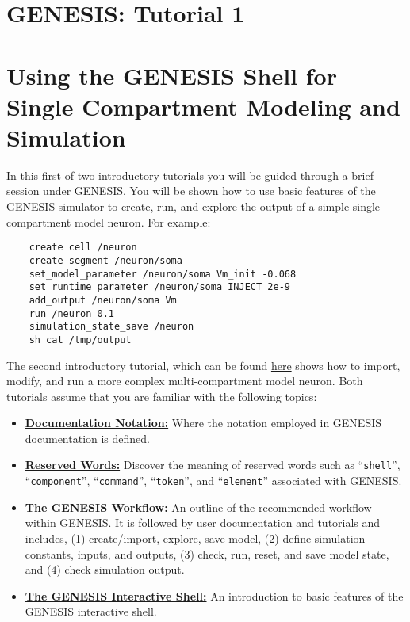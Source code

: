 \documentclass[12pt]{article}
\begin{document}
\section*{GENESIS: Tutorial 1}

\section*{Using the GENESIS Shell for\\Single Compartment Modeling and Simulation}

In this first of two introductory tutorials you will be guided through a brief session under GENESIS. You will be shown how to use basic features of the GENESIS simulator to create, run, and explore the output of a simple single compartment model neuron. For example:

\begin{verbatim}
    create cell /neuron
    create segment /neuron/soma
    set_model_parameter /neuron/soma Vm_init -0.068
    set_runtime_parameter /neuron/soma INJECT 2e-9
    add_output /neuron/soma Vm
    run /neuron 0.1
    simulation_state_save /neuron
    sh cat /tmp/output
\end{verbatim}
The second introductory tutorial, which can be found \href{../tutorial2/tutorial2.tex}{here} shows how to import, modify, and run a more complex multi-compartment model neuron. Both tutorials assume that you are familiar with the following topics:

\begin{itemize}

\item \href{../notation/notation.tex}{\bf Documentation Notation:} Where the notation employed in GENESIS documentation is defined.

\item \href{../reserved-words/reserved-words.tex}{\bf Reserved Words:} Discover the meaning of reserved words such as ``{\tt shell}'', ``{\tt component}'', ``{\tt command}'', ``{\tt token}'', and ``{\tt element}'' associated with GENESIS.

\item \href{../work-flow/work-flow.tex}{\bf The GENESIS Workflow:} An outline of the recommended workflow within GENESIS. It is followed by user documentation and tutorials and includes, (1) create/import, explore, save model, (2) define simulation constants, inputs, and outputs, (3) check, run, reset, and save model state, and (4) check simulation output.  

\item \href{../gshell/gshell.tex}{\bf The GENESIS Interactive Shell:} An introduction to basic features of the GENESIS interactive shell.

\end{itemize}
\end{document}
